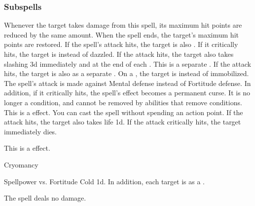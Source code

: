 \subsubsection{Subspells}
Whenever the target takes damage from this spell, its maximum hit points are reduced by the same amount.
When the spell ends, the target's maximum hit points are restored.
If the spell's attack hits, the target is also \dazzled. If it critically hits, the target is \blinded instead of dazzled.
If the attack hits, the target also takes slashing  \minus3d immediately and at the end of each .
This is a separate .
If the attack hits, the target is also  as a separate .
On a , the target is  instead of immobilized.
The spell's attack is made against Mental defense instead of Fortitude defense.
In addition, if it critically hits, the spell's effect becomes a permanent curse.
It is no longer a condition, and cannot be removed by abilities that remove conditions.
This is a  effect.
You can cast the spell without spending an action point.
If the attack hits, the target also takes life  \plus1d.
If the attack critically hits, the target immediately dies.
\par
This is a  effect.
\begin{spellsection}{Cryomancy}
\begin{spellheader}
\end{spellheader}
\begin{spellcontent}
\begin{spelltargetinginfo}
\end{spelltargetinginfo}
\begin{spelleffects}
\begin{spellattack}{Spellpower vs. Fortitude}
\spellsuccess
Cold  \minus1d.
In addition, each target is \fatigued as a .
\end{spellattack}
\end{spelleffects}
\end{spellcontent}
\begin{spellfooter}
\end{spellfooter}
\begin{spellsubcontent}
\begin{spellcantrip}
The spell deals no damage.
\end{spellcantrip}
\end{spellsubcontent}
\end{spellsection}
